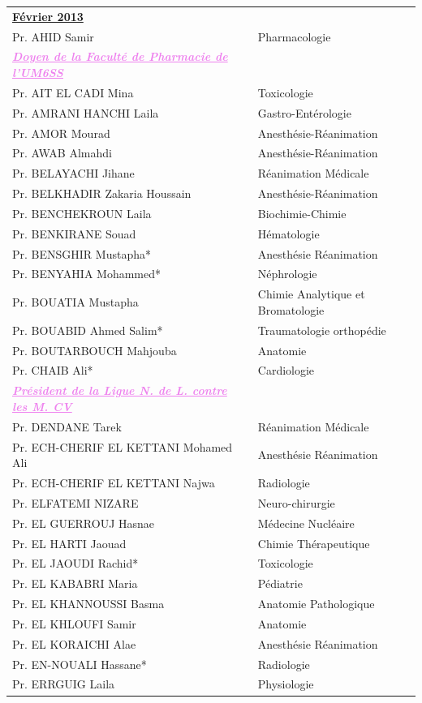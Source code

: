 \begin{table}[H]
  \begin{tabular}{l l}
    \multicolumn{2}{l}{\textbf{\underline{Février 2013}}}\vspace*{0.5em}\\
    Pr. AHID Samir & Pharmacologie \\
    \textcolor{violet}{\textbf{\emph{\underline{Doyen de la Faculté de Pharmacie de l’UM6SS}}}} & \\
    Pr. AIT EL CADI Mina & Toxicologie \\
    Pr. AMRANI HANCHI Laila & Gastro-Entérologie \\
    Pr. AMOR Mourad & Anesthésie-Réanimation \\
    Pr. AWAB Almahdi & Anesthésie-Réanimation \\
    Pr. BELAYACHI Jihane & Réanimation Médicale \\
    Pr. BELKHADIR Zakaria Houssain & Anesthésie-Réanimation \\
    Pr. BENCHEKROUN Laila & Biochimie-Chimie \\
    Pr. BENKIRANE Souad & Hématologie \\
    Pr. BENSGHIR Mustapha* & Anesthésie Réanimation \\
    Pr. BENYAHIA Mohammed* & Néphrologie \\
    Pr. BOUATIA Mustapha & Chimie Analytique et Bromatologie \\
    Pr. BOUABID Ahmed Salim* & Traumatologie orthopédie \\
    Pr. BOUTARBOUCH Mahjouba & Anatomie \\
    Pr. CHAIB Ali* & Cardiologie \\
    \textcolor{violet}{\textbf{\emph{\underline{Président de la Ligue N. de L. contre les M. CV}}}} & \\
    Pr. DENDANE Tarek & Réanimation Médicale \\
    Pr. ECH-CHERIF EL KETTANI Mohamed Ali & Anesthésie Réanimation \\
    Pr. ECH-CHERIF EL KETTANI Najwa & Radiologie \\
    Pr. ELFATEMI NIZARE & Neuro-chirurgie \\
    Pr. EL GUERROUJ Hasnae & Médecine Nucléaire \\
    Pr. EL HARTI Jaouad & Chimie Thérapeutique \\
    Pr. EL JAOUDI Rachid* & Toxicologie \\
    Pr. EL KABABRI Maria & Pédiatrie \\
    Pr. EL KHANNOUSSI Basma & Anatomie Pathologique \\
    Pr. EL KHLOUFI Samir & Anatomie \\
    Pr. EL KORAICHI Alae & Anesthésie Réanimation \\
    Pr. EN-NOUALI Hassane* & Radiologie \\
    Pr. ERRGUIG Laila & Physiologie \\
  \end{tabular}
\end{table}


